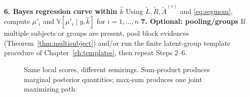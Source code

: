 \begin{algorithm}[H]
\For{$q=1$ \KwTo $\widehat{k}$}{
  Let $(i,j]\leftarrow (\widehat{t}^{\,\mathrm{MAP}}_{q-1},\widehat{t}^{\,\mathrm{MAP}}_{q}]$\;
  For $r\in\{1,2\}$ set $\widehat{\mu}^{(r)}_q \leftarrow \widetilde{A}^{(r)}_{ij}/\widetilde{A}^{(0)}_{ij}$ (cf.\ \eqref{eq:segmom-seg})\;
}
\BlankLine
\textbf{6. Bayes regression curve within $\widehat{k}$}\;
Using $\widetilde{L},\widetilde{R},\widetilde{A}^{(r)}$ and \eqref{eq:segmom}, compute $\widehat{\mu}'_i$ and $\mathbb{V}[\mu'_i\mid y,\widehat{k}]$ for $i=1,\dots,n$\;
\BlankLine
\textbf{7. Optional: pooling/groups}\;
If multiple subjects or groups are present, pool block evidences (Theorem~\ref{thm:multisubject}) and/or run the finite latent-group template procedure of Chapter~\ref{ch:templates}, then repeat Steps 2--6.
\end{algorithm}


\begin{figure}[H]
\centering
\resizebox{0.96\textwidth}{!}{}
\caption{Same local scores, different semirings. Sum-product produces marginal posterior quantities; max-sum produces one joint maximizing path.}
\label{fig:semiring-routes}
\end{figure}
